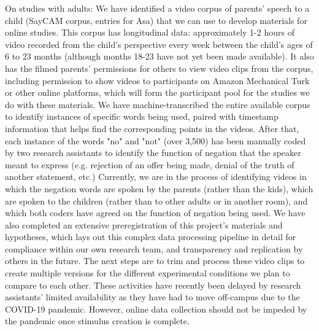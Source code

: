 \documentclass[11pt]{article}
\begin{document}
On studies with adults: We have identified a video corpus of parents' speech to a child (SayCAM corpus, entries for Asa) that we can use to develop materials for online studies. This corpus has longitudinal data: approximately 1-2 hours of video recorded from the child's perspective every week between the child's ages of 6 to 23 months (although months 18-23 have not yet been made available). It also has the filmed parents' permissions for others to view video clips from the corpus, including permission to show videos to participants on Amazon Mechanical Turk or other online platforms, which will form the participant pool for the studies we do with these materials. We have machine-transcribed the entire available corpus to identify instances of specific words being used, paired with timestamp information that helps find the corresponding points in the videos. After that, each instance of the words "no" and "not" (over 3,500) has been manually coded by two research assistants to identify the function of negation that the speaker meant to express (e.g. rejection of an offer being made, denial of the truth of another statement, etc.) Currently, we are in the process of identifying videos in which the negation words are spoken by the parents (rather than the kids), which are spoken to the children (rather than to other adults or in another room), and which both coders have agreed on the function of negation being used. We have also completed an extensive preregistration of this project's materials and hypotheses, which lays out this complex data processing pipeline in detail for compliance within our own research team, and transparency and replication by others in the future. The next steps are to trim and process these video clips to create multiple versions for the different experimental conditions we plan to compare to each other. These activities have recently been delayed by research assistants' limited availability as they have had to move off-campus due to the COVID-19 pandemic. However, online data collection should not be impeded by the pandemic once stimulus creation is complete.
 

 
 
\end{document}

